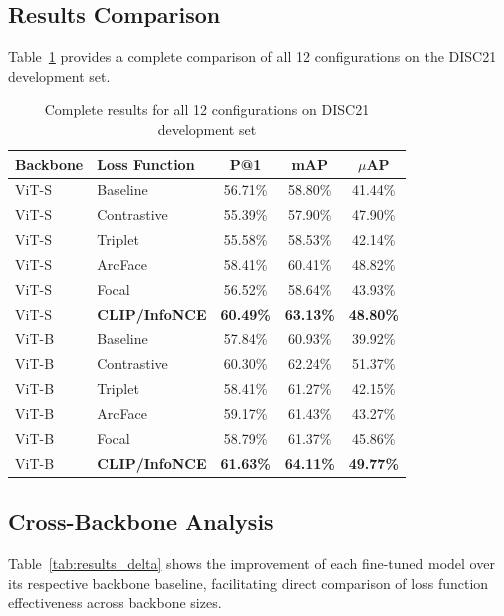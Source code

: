 \documentclass[
    english,
]{VUMIFPSbakalaurinis}
\begin{document}
\subsection{Results Comparison}

Table~\ref{tab:results_full} provides a complete comparison of all 12 configurations on the DISC21 development set.

\begin{table}[H]
\centering
\caption{Complete results for all 12 configurations on DISC21 development set}
\label{tab:results_full}
\begin{tabular}{llccc}
\toprule
\textbf{Backbone} & \textbf{Loss Function} & \textbf{P@1} & \textbf{mAP} & \textbf{$\mu$AP} \\
\midrule
ViT-S & Baseline & 56.71\% & 58.80\% & 41.44\% \\
ViT-S & Contrastive & 55.39\% & 57.90\% & 47.90\% \\
ViT-S & Triplet & 55.58\% & 58.53\% & 42.14\% \\
ViT-S & ArcFace & 58.41\% & 60.41\% & 48.82\% \\
ViT-S & Focal & 56.52\% & 58.64\% & 43.93\% \\
ViT-S & \textbf{CLIP/InfoNCE} & \textbf{60.49\%} & \textbf{63.13\%} & \textbf{48.80\%} \\
\midrule
ViT-B & Baseline & 57.84\% & 60.93\% & 39.92\% \\
ViT-B & Contrastive & 60.30\% & 62.24\% & 51.37\% \\
ViT-B & Triplet & 58.41\% & 61.27\% & 42.15\% \\
ViT-B & ArcFace & 59.17\% & 61.43\% & 43.27\% \\
ViT-B & Focal & 58.79\% & 61.37\% & 45.86\% \\
ViT-B & \textbf{CLIP/InfoNCE} & \textbf{61.63\%} & \textbf{64.11\%} & \textbf{49.77\%} \\
\bottomrule
\end{tabular}
\end{table}

\subsection{Cross-Backbone Analysis}

Table~\ref{tab:results_delta} shows the improvement of each fine-tuned model over its respective backbone baseline, facilitating direct comparison of loss function effectiveness across backbone sizes.
\end{document}
